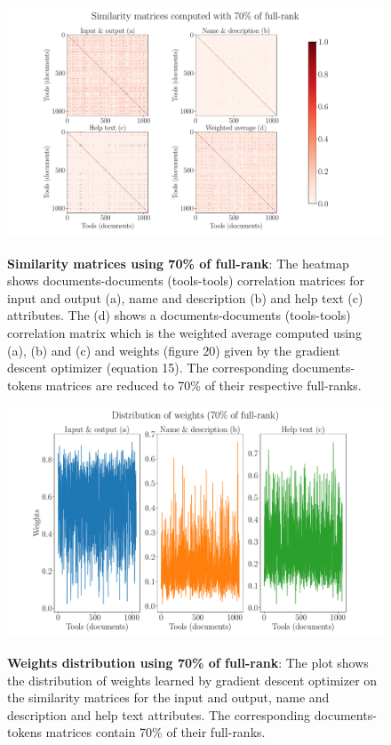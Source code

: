 \begin{figure}[h]
\begin{centering}
    {\includegraphics[scale=0.35]{figures/Similarity_matrices_070.pdf}}
    \caption[Similarity matrices 70\% rank]{\textbf{Similarity matrices using 70\% of full-rank}: The heatmap shows documents-documents (tools-tools) correlation matrices for input and output (a), name and description (b) and help text (c) attributes. The (d) shows a documents-documents (tools-tools) correlation matrix which is the weighted average computed using (a), (b) and (c) and weights (figure 20) given by the gradient descent optimizer (equation 15). The corresponding documents-tokens matrices are reduced to 70\% of their respective full-ranks.}
\end{centering}
\end{figure}

\begin{figure}[h]
\begin{centering}
    {\includegraphics[scale=0.35]{figures/Weights_070.pdf}}
    \caption[Weights distribution 70\% rank]{\textbf{Weights distribution using 70\% of full-rank}: The plot shows the distribution of weights learned by gradient descent optimizer on the similarity matrices for the input and output, name and description and help text attributes. The corresponding documents-tokens matrices contain 70\% of their full-ranks.}
\end{centering}
\end{figure}


